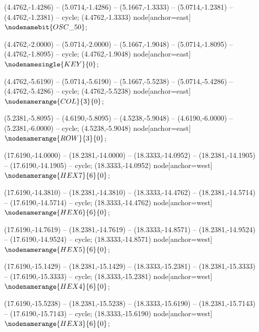    (4.4762,-1.4286) -- (5.0714,-1.4286) -- (5.1667,-1.3333) -- (5.0714,-1.2381) -- (4.4762,-1.2381) -- cycle;
   (4.4762,-1.3333) node[anchor=east] {$\nodenamebit{OSC\_50}$};

   (4.4762,-2.0000) -- (5.0714,-2.0000) -- (5.1667,-1.9048) -- (5.0714,-1.8095) -- (4.4762,-1.8095) -- cycle;
   (4.4762,-1.9048) node[anchor=east] {$\nodenamesingle{KEY}{0}$};

   (4.4762,-5.6190) -- (5.0714,-5.6190) -- (5.1667,-5.5238) -- (5.0714,-5.4286) -- (4.4762,-5.4286) -- cycle;
   (4.4762,-5.5238) node[anchor=east] {$\nodenamerange{COL}{3}{0}$};

   (5.2381,-5.8095) -- (4.6190,-5.8095) -- (4.5238,-5.9048) -- (4.6190,-6.0000) -- (5.2381,-6.0000) -- cycle;
   (4.5238,-5.9048) node[anchor=east] {$\nodenamerange{ROW}{3}{0}$};

   (17.6190,-14.0000) -- (18.2381,-14.0000) -- (18.3333,-14.0952) -- (18.2381,-14.1905) -- (17.6190,-14.1905) -- cycle;
   (18.3333,-14.0952) node[anchor=west] {$\nodenamerange{HEX7}{6}{0}$};

   (17.6190,-14.3810) -- (18.2381,-14.3810) -- (18.3333,-14.4762) -- (18.2381,-14.5714) -- (17.6190,-14.5714) -- cycle;
   (18.3333,-14.4762) node[anchor=west] {$\nodenamerange{HEX6}{6}{0}$};

   (17.6190,-14.7619) -- (18.2381,-14.7619) -- (18.3333,-14.8571) -- (18.2381,-14.9524) -- (17.6190,-14.9524) -- cycle;
   (18.3333,-14.8571) node[anchor=west] {$\nodenamerange{HEX5}{6}{0}$};

   (17.6190,-15.1429) -- (18.2381,-15.1429) -- (18.3333,-15.2381) -- (18.2381,-15.3333) -- (17.6190,-15.3333) -- cycle;
   (18.3333,-15.2381) node[anchor=west] {$\nodenamerange{HEX4}{6}{0}$};

   (17.6190,-15.5238) -- (18.2381,-15.5238) -- (18.3333,-15.6190) -- (18.2381,-15.7143) -- (17.6190,-15.7143) -- cycle;
   (18.3333,-15.6190) node[anchor=west] {$\nodenamerange{HEX3}{6}{0}$};

